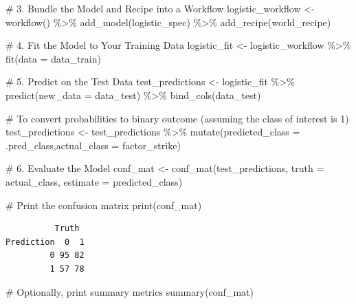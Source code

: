 \documentclass[
  letterpaper,
  DIV=11,
  numbers=noendperiod]{scrartcl}
\newenvironment{Shaded}{\begin{snugshade}}{\end{snugshade}}
\newcommand{\AttributeTok}[1]{\textcolor[rgb]{0.40,0.45,0.13}{#1}}
\newcommand{\CommentTok}[1]{\textcolor[rgb]{0.37,0.37,0.37}{#1}}
\newcommand{\FunctionTok}[1]{\textcolor[rgb]{0.28,0.35,0.67}{#1}}
\newcommand{\NormalTok}[1]{\textcolor[rgb]{0.00,0.23,0.31}{#1}}
\newcommand{\OtherTok}[1]{\textcolor[rgb]{0.00,0.23,0.31}{#1}}
\newcommand{\SpecialCharTok}[1]{\textcolor[rgb]{0.37,0.37,0.37}{#1}}
\begin{document}
\begin{Shaded}
\begin{Highlighting}[]
\CommentTok{\# 3. Bundle the Model and Recipe into a Workflow}
\NormalTok{logistic\_workflow }\OtherTok{\textless{}{-}} \FunctionTok{workflow}\NormalTok{() }\SpecialCharTok{\%\textgreater{}\%} 
  \FunctionTok{add\_model}\NormalTok{(logistic\_spec) }\SpecialCharTok{\%\textgreater{}\%} 
  \FunctionTok{add\_recipe}\NormalTok{(world\_recipe)}

\CommentTok{\# 4. Fit the Model to Your Training Data}
\NormalTok{logistic\_fit }\OtherTok{\textless{}{-}}\NormalTok{ logistic\_workflow }\SpecialCharTok{\%\textgreater{}\%} 
  \FunctionTok{fit}\NormalTok{(}\AttributeTok{data =}\NormalTok{ data\_train)}

\CommentTok{\# 5. Predict on the Test Data}
\NormalTok{test\_predictions }\OtherTok{\textless{}{-}}\NormalTok{ logistic\_fit }\SpecialCharTok{\%\textgreater{}\%} 
  \FunctionTok{predict}\NormalTok{(}\AttributeTok{new\_data =}\NormalTok{ data\_test) }\SpecialCharTok{\%\textgreater{}\%} 
  \FunctionTok{bind\_cols}\NormalTok{(data\_test)}


\CommentTok{\# To convert probabilities to binary outcome (assuming the class of interest is 1)}
\NormalTok{test\_predictions }\OtherTok{\textless{}{-}}\NormalTok{ test\_predictions }\SpecialCharTok{\%\textgreater{}\%}
  \FunctionTok{mutate}\NormalTok{(}\AttributeTok{predicted\_class =}\NormalTok{ .pred\_class,}\AttributeTok{actual\_class =}\NormalTok{ factor\_strike)}

\CommentTok{\# 6. Evaluate the Model}
\NormalTok{conf\_mat }\OtherTok{\textless{}{-}} \FunctionTok{conf\_mat}\NormalTok{(test\_predictions, }\AttributeTok{truth =}\NormalTok{ actual\_class, }\AttributeTok{estimate =}\NormalTok{ predicted\_class)}

\CommentTok{\# Print the confusion matrix}
\FunctionTok{print}\NormalTok{(conf\_mat)}
\end{Highlighting}
\end{Shaded}

\begin{verbatim}
          Truth
Prediction  0  1
         0 95 82
         1 57 78
\end{verbatim}

\begin{Shaded}
\begin{Highlighting}[]
\CommentTok{\# Optionally, print summary metrics}
\FunctionTok{summary}\NormalTok{(conf\_mat)}
\end{Highlighting}
\end{Shaded}
\end{document}
